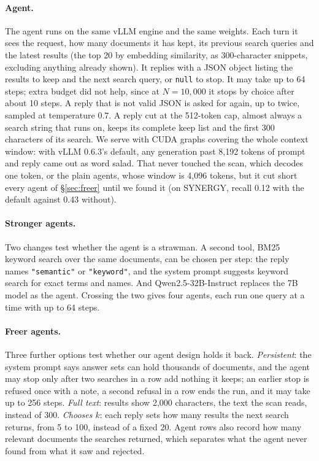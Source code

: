 \documentclass[11pt]{article}
\begin{document}
\paragraph{Agent.}
The agent runs on the same vLLM engine and the same weights. Each turn it sees
the request, how many documents it has kept, its previous search queries and
the latest results (the top 20 by embedding similarity, as 300-character
snippets, excluding anything already shown). It replies with a JSON object
listing the results to keep and the next search query, or \texttt{null} to
stop. It may take up to 64 steps; extra budget did not help, since at
$N=10{,}000$ it stops by choice after about 10 steps. A reply that is not valid
JSON is asked for again, up to twice, sampled at temperature 0.7. A reply cut at
the 512-token cap, almost always a search string that runs on, keeps its
complete keep list and the first 300 characters of its search. We serve with
CUDA graphs covering the whole context window: with vLLM 0.6.3's default, any
generation past 8,192 tokens of prompt and reply came out as word salad. That
never touched the scan, which decodes one token, or the plain agents, whose
window is 4,096 tokens, but it cut short every agent of \S\ref{sec:freer} until
we found it (on SYNERGY, recall 0.12 with the default against 0.43 without).

\paragraph{Stronger agents.}
Two changes test whether the agent is a strawman. A second tool,
BM25~\cite{robertson2009bm25} keyword search over the same documents, can be
chosen per step: the reply names \texttt{"semantic"} or \texttt{"keyword"}, and
the system prompt suggests keyword search for exact terms and names. And
Qwen2.5-32B-Instruct replaces the 7B model as the agent. Crossing the two gives
four agents, each run one query at a time with up to 64 steps.

\paragraph{Freer agents.}
Three further options test whether our agent design holds it back.
\emph{Persistent}: the system prompt says answer sets can hold thousands of
documents, and the agent may stop only after two searches in a row add nothing
it keeps; an earlier stop is refused once with a note, a second refusal in a
row ends the run, and it may take up to 256 steps. \emph{Full text}: results
show 2,000 characters, the text the scan reads, instead of 300. \emph{Chooses
$k$}: each reply sets how many results the next search returns, from 5 to 100,
instead of a fixed 20. Agent rows also record how many relevant documents the
searches returned, which separates what the agent never found from what it saw
and rejected.
\end{document}
